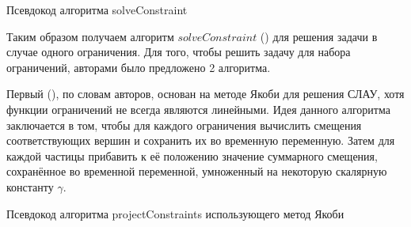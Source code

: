 	\begin{algorithm} %
		\nonl{}
		\caption{Псевдокод алгоритма solveConstraint}\label{alg:SolveConstraint}
	\end{algorithm}
	\FloatBarrier
	
	Таким образом получаем алгоритм $solveConstraint$ () для решения задачи в случае одного ограничения. Для того, чтобы решить задачу для набора ограничений, авторами было предложено 2 алгоритма. 
	
	Первый (), по словам авторов, основан на методе Якоби для решения СЛАУ, хотя функции ограничений не всегда являются линейными. Идея данного алгоритма заключается в том, чтобы для каждого ограничения вычислить смещения соответствующих вершин и сохранить их во временную переменную. Затем для каждой частицы прибавить к её положению значение суммарного смещения, сохранённое во временной переменной, умноженный на некоторую скалярную константу $\gamma$.
	
	\begin{algorithm} %
		\nonl{}
		\caption{Псевдокод алгоритма projectConstraints использующего метод Якоби}\label{alg:projectConstraintsJacobi}
	\end{algorithm}
	\FloatBarrier

